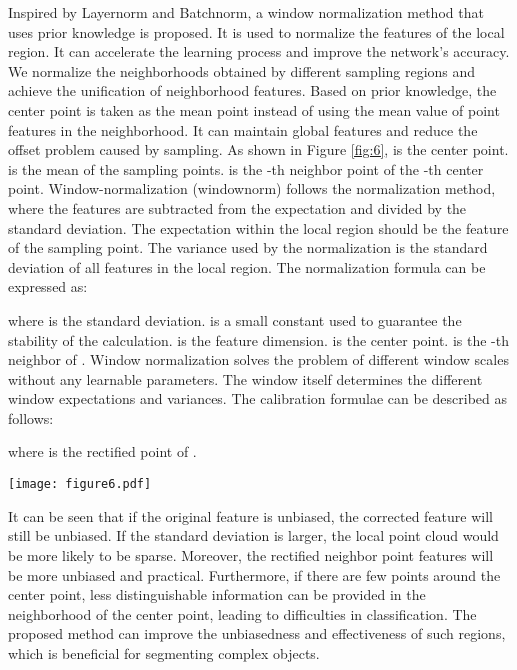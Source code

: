 \documentclass[10pt,twocolumn,letterpaper]{article}
\begin{document}
        Inspired by Layernorm and Batchnorm, a window normalization method that uses prior knowledge is proposed. It is used to normalize the features of the local region. It can accelerate the learning process and improve the network's accuracy. We normalize the neighborhoods obtained by different sampling regions and achieve the unification of neighborhood features. Based on prior knowledge, the center point is taken as the mean point instead of using the mean value of point features in the neighborhood. It can maintain global features and reduce the offset problem caused by sampling. As shown in Figure \ref{fig:6},  is the center point.  is the mean of the sampling points.  is the -th neighbor point of the -th center point. Window-normalization (windownorm) follows the normalization method, where the features are subtracted from the expectation and divided by the standard deviation. The expectation within the local region should be the feature of the sampling point. The variance used by the normalization is the standard deviation of all features in the local region. The normalization formula can be expressed as:
        
        where  is the standard deviation.  is a small constant used to guarantee the stability of the calculation.  is the feature dimension.  is the center point.  is the -th neighbor of . Window normalization solves the problem of different window scales without any learnable parameters. The window itself determines the different window expectations and variances. The calibration formulae can be described as follows:
        
        
        
        where  is the rectified point of .
        \begin{figure*}[!htb]
        \centering
        \texttt{[image: figure6.pdf]}
        \caption{We use the window-normalization method with prior knowledge to calibrate local features. (a) Original expectation by KNN. (b) Calibrated expectation by proposed method}
        \label{fig:6}
        \end{figure*}

        It can be seen that if the original feature is unbiased, the corrected feature will still be unbiased.
        If the standard deviation is larger, the local point cloud would be more likely to be sparse.
        Moreover, the rectified neighbor point features will be more unbiased and practical.
        Furthermore, if there are few points around the center point, less distinguishable information can be provided in the neighborhood of the center point, leading to difficulties in classification.
        The proposed method can improve the unbiasedness and effectiveness of such regions, which is beneficial for segmenting complex objects.
\end{document}
